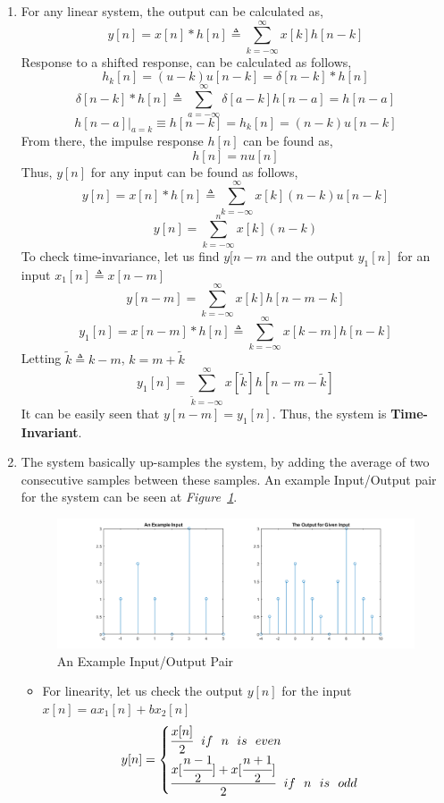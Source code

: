 \documentclass[a4paper,12pt]{article}
\begin{document}
\begin{enumerate}
\begin{itemize}
		\end{itemize}
		
	 
	
	\item For any linear system, the output can be calculated as,
		$$	y[n]=x[n]*h[n]\triangleq\sum_{k=-\infty}^{\infty} x[k]h[n-k]	$$		
		Response to a shifted response, can be calculated as follows,
		$$	h_k[n]=(u-k)u[n-k]=\delta[n-k]*h[n]	$$
		$$	\delta[n-k]*h[n]\triangleq\sum_{a=-\infty}^{\infty} \delta [a-k]h[n-a]=h[n-a] 	$$
		$$ h[n-a]|_{a=k} \equiv h[n-k]=h_k[n]=(n-k)u[n-k] $$
		From there, the impulse response $h[n]$ can be found as,
		$$ h[n]=nu[n] $$
		Thus, $y[n]$ for any input can be found as follows,
		$$	y[n]=x[n]*h[n]\triangleq\sum_{k=-\infty}^{\infty} x[k](n-k)u[n-k]$$
		$$	\boxed{	y[n]=\sum_{k=-\infty}^{n} x[k](n-k)	} $$
		To check time-invariance, let us find $y[n-m$ and the output $y_1[n]$ for an input $x_1[n]\triangleq x[n-m]$
		$$	y[n-m]=	\sum_{k=-\infty}^{\infty} x[k]h[n-m-k] $$
		$$ y_1[n]= x[n-m]*h[n] \triangleq \sum_{k=-\infty}^{\infty} x[k-m] h[n-k] $$		
		Letting $ \widetilde{k} \triangleq k-m $, $k=m+\widetilde{k}$
		$$ y_1[n] = \sum_{\widetilde{k}=-\infty}^{\infty} x[\widetilde{k}]h[n-m-\widetilde{k}]		$$
		It can be easily seen that $y[n-m]=y_1[n]$. Thus, the system is \textbf{Time-Invariant}.
	
	\item The system basically up-samples the system, by adding the average of two consecutive samples between these samples. An example Input/Output pair for the system can be seen at \textit{Figure~\ref{fig:ioq4}}.
	
		\begin{figure}[H]
			\centering
			\setlength{\unitlength}{\textwidth} 
			\includegraphics[width=1.0\unitlength]{q4}
			\caption{\label{fig:ioq4}An Example Input/Output Pair }
		\end{figure}
		
		\begin{itemize}
			\item For linearity, let us check the output $y[n]$ for the input $x[n]=ax_1[n]+bx_2[n]$
				$$  y[n] = 
     		\begin{cases}
     			\cfrac{x[n]}{2} ~~ if ~~ n~~is~~even \\
     			\cfrac{x[\cfrac{n-1}{2}]+x[\cfrac{n+1}{2}]}{2} ~~ if ~~ n~~is~~odd\\
     		\end{cases}	$$
     		

\end{itemize}
\end{enumerate}
\end{document}
